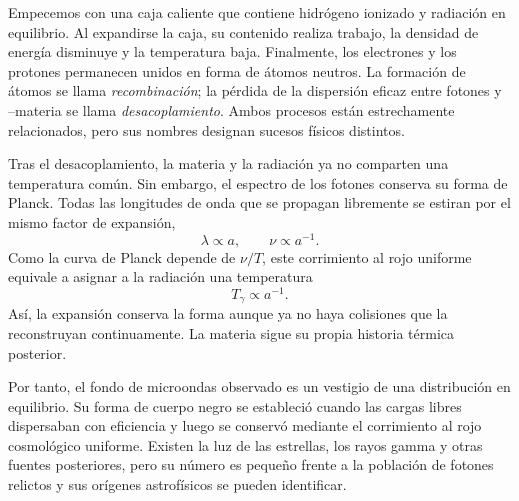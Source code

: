 Empecemos con una caja caliente que contiene hidrógeno ionizado y radiación en equilibrio. Al expandirse la caja, su contenido realiza trabajo, la densidad de energía disminuye y la temperatura baja. Finalmente, los electrones y los protones permanecen unidos en forma de átomos neutros. La formación de átomos se llama \emph{recombinación}; la pérdida de la dispersión eficaz entre fotones y --materia se llama \emph{desacoplamiento}. Ambos procesos están estrechamente relacionados, pero sus nombres designan sucesos físicos distintos.

Tras el desacoplamiento, la materia y la radiación ya no comparten una temperatura común. Sin embargo, el espectro de los fotones conserva su forma de Planck. Todas las longitudes de onda que se propagan libremente se estiran por el mismo factor de expansión,
\begin{equation}
\lambda\propto a,
\qquad
\nu\propto a^{-1}.
\end{equation}
Como la curva de Planck depende de \(\nu/T\), este corrimiento al rojo uniforme equivale a asignar a la radiación una temperatura
\begin{equation}
\boxed{T_\gamma\propto a^{-1}.}
\label{eq:c07-temperature-scaling}
\end{equation}
Así, la expansión conserva la forma aunque ya no haya colisiones que la reconstruyan continuamente. La materia sigue su propia historia térmica posterior.

Por tanto, el fondo de microondas observado es un vestigio de una distribución en equilibrio. Su forma de cuerpo negro se estableció cuando las cargas libres dispersaban con eficiencia y luego se conservó mediante el corrimiento al rojo cosmológico uniforme. Existen la luz de las estrellas, los rayos gamma y otras fuentes posteriores, pero su número es pequeño frente a la población de fotones relictos y sus orígenes astrofísicos se pueden identificar.

\begin{classroomqa}
\end{classroomqa}

